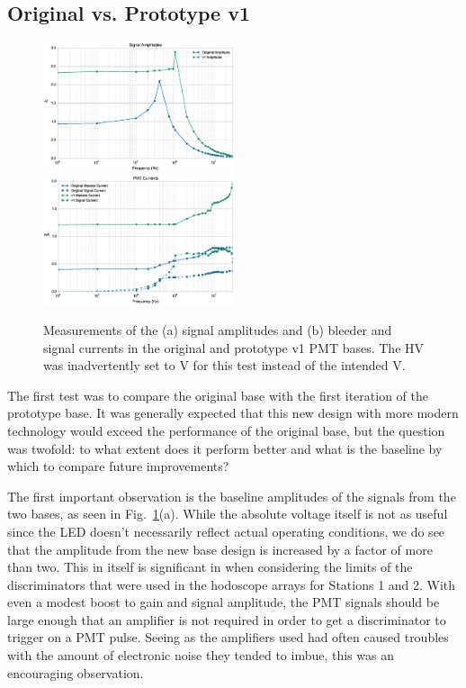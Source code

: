 \subsection{Original vs. Prototype v1}

\begin{figure}[h]
	\centerline{
		\mbox{\includegraphics[width=0.5\textwidth]{figures/Test_v1_Amp.eps} \includegraphics[width=0.5\textwidth]{figures/Test_v1_Current.eps}}}
	\caption{Measurements of the (a) signal amplitudes and (b) bleeder and signal currents in the original and prototype v1 PMT bases. The HV was inadvertently set to \unit[-1600V]{V} for this test instead of the intended \unit[-1500]{V}.}
	\label{fig:test-v1}
\end{figure}

The first test was to compare the original base with the first iteration of the prototype base. It was generally expected that this new design with more modern technology would exceed the performance of the original base, but the question was twofold: to what extent does it perform better and what is the baseline by which to compare future improvements? 

The first important observation is the baseline amplitudes of the signals from the two bases, as seen in Fig.~\ref{fig:test-v1}(a). While the absolute voltage itself is not as useful since the LED doesn't necessarily reflect actual operating conditions, we do see that the amplitude from the new base design is increased by a factor of more than two. This in itself is significant in when considering the limits of the discriminators that were used in the hodoscope arrays for Stations 1 and 2. With even a modest boost to gain and signal amplitude, the PMT signals should be large enough that an amplifier is not required in order to get a discriminator to trigger on a PMT pulse. Seeing as the amplifiers used had often caused troubles with the amount of electronic noise they tended to imbue, this was an encouraging observation.

